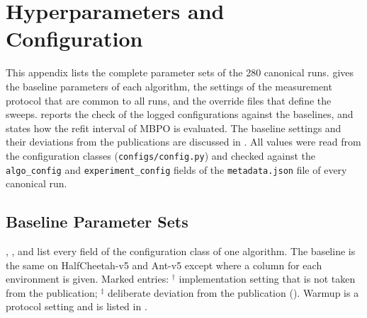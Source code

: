 \chapter{Hyperparameters and Configuration}
\label{app:hyperparameters}

This appendix lists the complete parameter sets of the \num{280} canonical runs.
 gives the baseline parameters of each algorithm,  the settings of the measurement protocol that are common to all runs, and  the override files that define the sweeps.
 reports the check of the logged configurations against the baselines, and  states how the refit interval of MBPO is evaluated.
The baseline settings and their deviations from the publications are discussed in .
All values were read from the configuration classes (\texttt{configs/config.py}) and checked against the \texttt{algo\_config} and \texttt{experiment\_config} fields of the \texttt{metadata.json} file of every canonical run.

\section{Baseline Parameter Sets}\label{sec:app-hp-baselines}

, ,  and  list every field of the configuration class of one algorithm.
The baseline is the same on HalfCheetah-v5 and Ant-v5 except where a column for each environment is given.
Marked entries: $^{\dagger}$ implementation setting that is not taken from the publication; $^{\ddagger}$ deliberate deviation from the publication ().
Warmup is a protocol setting and is listed in .

